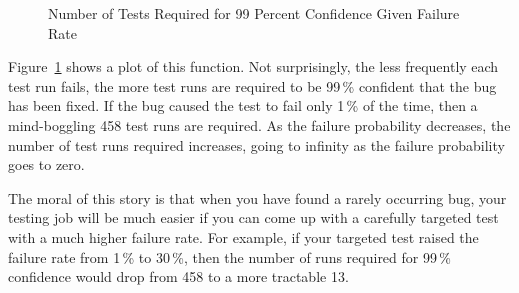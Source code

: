 \QuickQuizEnd

\begin{figure}[tb]
\centering
{}
\caption{Number of Tests Required for 99 Percent Confidence Given Failure Rate}
\label{fig:debugging:Number of Tests Required for 99 Percent Confidence Given Failure Rate}
\end{figure}

Figure~\ref{fig:debugging:Number of Tests Required for 99 Percent Confidence Given Failure Rate}
shows a plot of this function.
Not surprisingly, the less frequently each test run fails, the more
test runs are required to be 99\,\% confident that the bug has been
fixed.
If the bug caused the test to fail only 1\,\% of the time, then a
mind-boggling 458 test runs are required.
As the failure probability decreases, the number of test runs required
increases, going to infinity as the failure probability goes to zero.

The moral of this story is that when you have found a rarely occurring
bug, your testing job will be much easier if you can come up with
a carefully targeted test with a much higher failure rate.
For example, if your targeted test raised the failure rate from 1\,\%
to 30\,\%, then the number of runs required for 99\,\% confidence
would drop from 458 to a more tractable 13.

